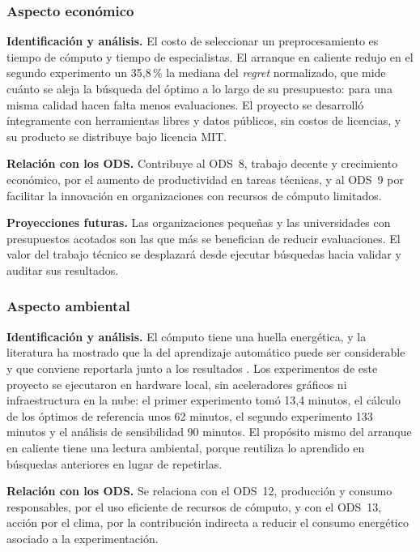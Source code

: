 \subsubsection*{Aspecto económico}

\textbf{Identificación y análisis.} El costo de seleccionar un preprocesamiento es tiempo de
cómputo y tiempo de especialistas. El arranque en caliente redujo en el segundo experimento
un 35,8\,\% la mediana del \textit{regret} normalizado, que mide cuánto se aleja la búsqueda
del óptimo a lo largo de su presupuesto: para una misma calidad hacen falta menos
evaluaciones. El proyecto se desarrolló íntegramente con herramientas libres y datos
públicos, sin costos de licencias, y su producto se distribuye bajo licencia MIT.

\textbf{Relación con los ODS.} Contribuye al ODS~8, trabajo decente y crecimiento económico,
por el aumento de productividad en tareas técnicas, y al ODS~9 por facilitar la innovación
en organizaciones con recursos de cómputo limitados.

\textbf{Proyecciones futuras.} Las organizaciones pequeñas y las universidades con
presupuestos acotados son las que más se benefician de reducir evaluaciones. El valor del
trabajo técnico se desplazará desde ejecutar búsquedas hacia validar y auditar sus
resultados.

\subsubsection*{Aspecto ambiental}

\textbf{Identificación y análisis.} El cómputo tiene una huella energética, y la literatura
ha mostrado que la del aprendizaje automático puede ser considerable y que conviene
reportarla junto a los resultados \cite{strubell2019energy, schwartz2020green}. Los
experimentos de este proyecto se ejecutaron en hardware local, sin aceleradores gráficos ni
infraestructura en la nube: el primer experimento tomó 13,4 minutos, el cálculo de los
óptimos de referencia unos 62 minutos, el segundo experimento 133 minutos y el análisis de
sensibilidad 90 minutos. El propósito mismo del arranque en caliente tiene una lectura
ambiental, porque reutiliza lo aprendido en búsquedas anteriores en lugar de repetirlas.

\textbf{Relación con los ODS.} Se relaciona con el ODS~12, producción y consumo responsables,
por el uso eficiente de recursos de cómputo, y con el ODS~13, acción por el clima, por la
contribución indirecta a reducir el consumo energético asociado a la experimentación.

